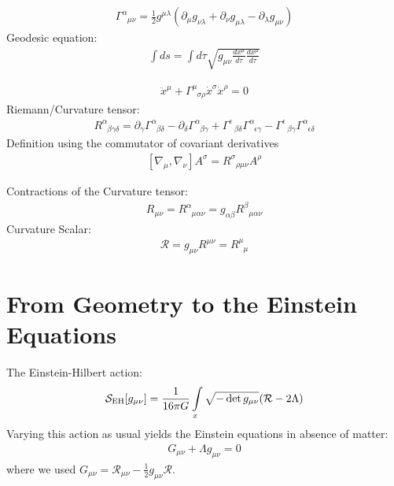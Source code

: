  
\begin{align}
\Gamma_{\phantom{\alpha}\mu \nu}^{\alpha}=\frac{1}{2} g^{\mu \lambda}\left(\partial_{\mu} g_{\nu \lambda}+\partial_{\nu} g_{\mu \lambda}-\partial_{\lambda} g_{\mu \nu}\right)	
\end{align}
Geodesic equation:
\begin{align}
	\int d s=\int d \tau \sqrt{g_{\mu \nu} \frac{d x^{\mu}}{d \tau} \frac{d x^{\mu}}{d \tau}}
\end{align}

\begin{align}
	\ddot{x}^{\mu}+\Gamma_{\phantom{\mu}\sigma \rho}^{\mu} \dot{x}^{\sigma} \dot{x}^{\rho}=0
\end{align}
Riemann/Curvature tensor:
\begin{align}
	R_{\phantom{\alpha}\beta \gamma \delta}^{\alpha}=\partial_{\gamma} \Gamma_{\phantom{\alpha}\beta \delta}^{\alpha}-\partial_{\delta} \Gamma_{\phantom{\alpha}\beta \gamma}^{\alpha}+\Gamma_{\phantom{\alpha}\beta \delta}^{\epsilon} \Gamma_{\phantom{\alpha}\epsilon \gamma}^{\alpha}-\Gamma_{\phantom{\alpha}\beta \gamma}^{\epsilon} \Gamma_{\phantom{\alpha}\epsilon \delta}^{\alpha}
\end{align}
Definition using the commutator of covariant derivatives
\begin{align}
	\left[\nabla_{\mu}, \nabla_{\nu}\right] A^{\sigma}=R_{\phantom{\alpha}\rho \mu \nu}^{\sigma} A^{\rho} \label{eqn:Riemann}
\end{align}

Contractions of the Curvature tensor:
\begin{align}
	R_{\mu\nu} = R^{\alpha}_{\phantom{\alpha}\mu\alpha\nu} = g_{\alpha\beta} R^{\beta}_{\phantom{\alpha}\mu\alpha\nu}
\end{align}
Curvature Scalar:
\begin{align}
\mathcal{R} = g_{\mu\nu}R^{\mu\nu} = R^{\mu}_{\phantom{\mu}\mu}
\end{align}






\section{From Geometry to the Einstein Equations}


The Einstein-Hilbert action:
\begin{align}
	\mathcal{S}_{\text{EH}}[g_{\mu\nu}] = \frac{1}{16\pi G} \int\limits_x \sqrt{-\operatorname{det}g_{\mu\nu}} (\mathcal{R} - 2\Lambda)
\end{align}
Varying this action as usual yields the Einstein equations in absence of matter:
\begin{align}
	G_{\mu\nu} + \Lambda g_{\mu\nu} = 0
\end{align}
where we used $G_{\mu\nu} = \mathcal{R}_{\mu\nu} - \frac{1}{2}g_{\mu\nu}\mathcal{R}$. \\


